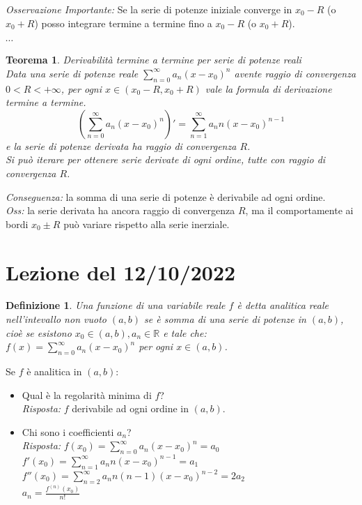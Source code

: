 \documentclass{scrreprt}
\newtheorem{defn}{Definizione}
\newenvironment{definition}{\begin{mdframed}[backgroundcolor=Ivory2]\begin{defn}}{\end{defn}\end{mdframed}}
\newtheorem{teorema}{Teorema}
\newenvironment{thm}{\begin{mdframed}[backgroundcolor=Ivory2]\begin{teorema}}{\end{teorema}\end{mdframed}}
\begin{document}
\emph{Osservazione Importante:} Se la serie di potenze iniziale converge in $x_0-R$ (o $x_0+R$) posso integrare termine a termine fino a $x_0-R$ (o $x_0+R$).\\

\begin{center}
	$\cdots$
\end{center}


\begin{thm}
	Derivabilità termine a termine per serie di potenze reali\\
	Data una serie di potenze reale $\sum_{n=0}^\infty a_n \left(x-x_0\right)^n$ avente raggio di convergenza $0<R<+\infty$, per ogni $x\in\left(x_0-R,x_0+R\right)$ vale la formula di derivazione termine a termine.
	\begin{equation}
		\left(\sum_{n=0}^\infty a_n \left(x-x_0\right)^n\right)'  = \sum_{n=1}^\infty  a_n n \left(x-x_0\right)^{n-1}
	\end{equation}
	e la serie di potenze derivata ha raggio di convergenza $R$.\\
	Si può iterare per ottenere serie derivate di ogni ordine, tutte con raggio di convergenza $R$.

\end{thm}

\noindent\emph{Conseguenza:} la somma di una serie di potenze è derivabile ad ogni ordine.\\
\emph{Oss:} la serie derivata ha ancora raggio di convergenza $R$, ma il comportamente ai bordi $x_0\pm R$ può variare rispetto alla serie inerziale.\\

\section{Lezione del 12/10/2022}
\begin{definition}
	Una funzione di una variabile reale $f$ è detta analitica reale nell'intevallo non vuoto $(a,b)$ se è somma di una serie di potenze in $(a,b)$, cioè se esistono $x_0\in (a,b), a_n \in \mathbb{R}$ e tale che:\\
	$f(x) = \sum_{n=0}^\infty a_n \left(x-x_0\right)^n$ per ogni $x\in (a,b)$.
\end{definition}

Se $f$ è analitica in $(a,b)$:
\begin{itemize}
	\item Qual è la regolarità minima di $f$?\\
		\emph{Risposta:} $f$ derivabile ad ogni ordine in $(a,b)$.
	\item Chi sono i coefficienti $a_n$?\\
		\emph{Risposta:} $f(x_0) = \sum_{n=0}^\infty a_n \left(x-x_0\right)^n = a_0$\\
		$f'(x_0) = \sum_{n=1}^\infty a_n n \left(x-x_0\right)^{n-1} = a_1$\\
		$f''(x_0) = \sum_{n=2}^\infty a_n n(n-1) \left(x-x_0\right)^{n-2} = 2a_2$\\
		$a_n = \frac{f^{(n)}(x_0)}{n!}$
\end{itemize}
\end{document}
